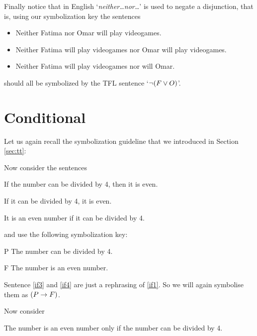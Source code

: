 Finally notice that in English `\emph{neither\ldots nor\ldots}' is used to negate a disjunction, that is, using our symbolization key the sentences
\begin{itemize}
\item Neither Fatima nor Omar will play videogames.
\item Neither Fatima will play videogames nor Omar will play videogames.
\item  Neither Fatima will play videogames nor will Omar.
\end{itemize}
should all be symbolized by the TFL sentence `$\neg(F\vee O)$'.



\section{Conditional}
Let us again recall the symbolization guideline that we introduced in Section \ref{sec:tt}:


\noindent Now consider the sentences
\begin{earg}
	\item[\ex{if1}] If the number can be divided by 4, then it is even. 
		\item[\ex{if3}] If it can be divided by 4, it is even. 
		\item[\ex{if4}] It is an even number if it can be divided by 4.
\end{earg}

and use the following symbolization key:
	\begin{ekey}
		\item[P] The number can be divided by 4.
		\item[F] The number is an even number.
	\end{ekey}
Sentence \ref{if3} and \ref{if4} are just a rephrasing of \ref{if1}. So we will again symbolise them as $(P\rightarrow F)$.

Now consider
\begin{earg}
		\item[\ex{if2}] The number is an even number only if the number can be divided by 4.
\end{earg}

